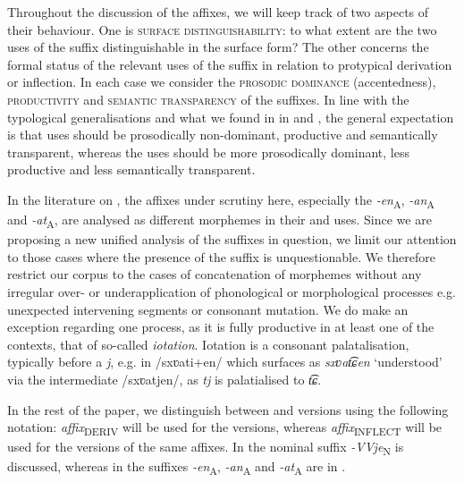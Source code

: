 \documentclass[output=paper, colorlinks, citecolor=brown, newtxmath]{langsci/langscibook}
\begin{document}
Throughout the discussion of the affixes, we will keep track of two aspects of their behaviour. One is \textsc{surface distinguishability}: to what extent are the two uses of the suffix distinguishable in the surface form? The other concerns the formal status of the relevant uses of the suffix in relation to protypical derivation or inflection. In each case we consider the \textsc{prosodic dominance} (accentedness), \textsc{productivity} and \textsc{semantic transparency} of the suffixes. In line with the typological generalisations and what we found in  in \citet{Arsim2013} and \citet{Sim2014}, the general expectation is that  uses should be prosodically non-dominant, productive and semantically transparent, whereas the  uses should be more prosodically dominant, less productive and less semantically transparent.

In the literature on , the affixes under scrutiny here, especially the  \textit{-en}\textsubscript{A}, \textit{-an}\textsubscript{A} and  \textit{-at}\textsubscript{A}, are analysed as different morphemes in their  and  uses. Since we are proposing a new unified analysis of the suffixes in question, we limit our attention to those cases where the presence of the suffix is unquestionable. We therefore restrict our corpus to the cases of concatenation of morphemes without any irregular over- or underapplication of phonological or morphological processes e.g. unexpected intervening segments or consonant mutation. We do make an exception regarding one process, as it is fully productive in at least one of the contexts, that of so-called \textit{iotation}. Iotation is a consonant palatalisation, typically before a \textit{j}, e.g. in /sxʋati+en/ which surfaces as \textit{sxʋat͡ɕen} `understood' via the intermediate /sxʋatjen/, as \textit{tj} is palatialised to \textit{t͡ɕ}.

\largerpage
In the rest of the paper, we distinguish between  and  versions using the following notation: \textit{affix}\textsubscript{DERIV} will be used for the  versions, whereas \textit{affix}\textsubscript{INFLECT} will be used for the  versions of the same affixes.
In  the nominal suffix \textit{-VVje}\textsubscript{N} is discussed, whereas in   the  suffixes \textit{{-en}}\textsubscript{A}, \textit{{-an}}\textsubscript{A} and \textit{{-at}}\textsubscript{A} are in .
\end{document}
